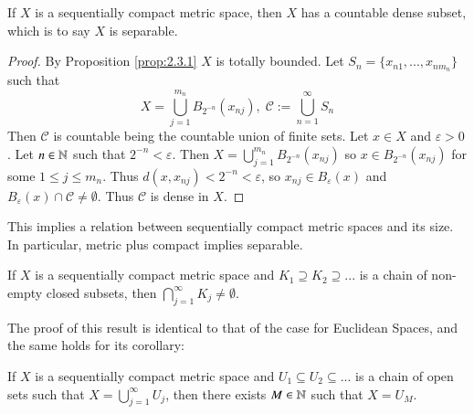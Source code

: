 \begin{corollary}\label{cor:2.3.2}
    If $X$ is a sequentially compact metric space, then $X$ has a countable dense subset, which is to say $X$ is separable.
\end{corollary}
\begin{proof}
    By Proposition \ref{prop:2.3.1} $X$ is totally bounded. Let $S_n = \{x_{n1},...,x_{nm_n}\}$ such that \begin{equation*}
        X = \bigcup_{j=1}^{m_n}B_{2^{-n}}(x_{nj}), \;\mathcal{C} := \bigcup_{n=1}^{\infty}S_n
    \end{equation*}
    Then $\mathcal{C}$ is countable being the countable union of finite sets. Let $x \in X$ and $\varepsilon > 0$. Let $n \in \mathbb N$ such that $2^{-n} < \varepsilon$. Then $X = \bigcup_{j=1}^{m_n}B_{2^{-n}}(x_{nj})$ so $x \in B_{2^{-n}}(x_{nj})$ for some $1 \leq j \leq m_n$. Thus $d(x,x_{nj}) < 2^{-n}<\varepsilon$, so $x_{nj} \in B_{\varepsilon}(x)$ and $B_{\varepsilon}(x)\cap \mathcal{C} \neq \emptyset$. Thus $\mathcal{C}$ is dense in $X$.
\end{proof}

This implies a relation between sequentially compact metric spaces and its size. In particular, metric plus compact implies separable.

\begin{proposition}\label{prop:2.3.3}
    If $X$ is a sequentially compact metric space and $K_1 \supseteq K_2 \supseteq ...$ is a chain of non-empty closed subsets, then $\bigcap_{j=1}^{\infty}K_j \neq \emptyset$.
\end{proposition}

The proof of this result is identical to that of the case for Euclidean Spaces, and the same holds for its corollary:

\begin{corollary}\label{cor:2.3.4}
    If $X$ is a sequentially compact metric space and $U_1 \subseteq U_2 \subseteq ...$ is a chain of open sets such that $X = \bigcup_{j=1}^{\infty} U_j$, then there exists $M \in \mathbb N$ such that $X = U_M$.
\end{corollary}

